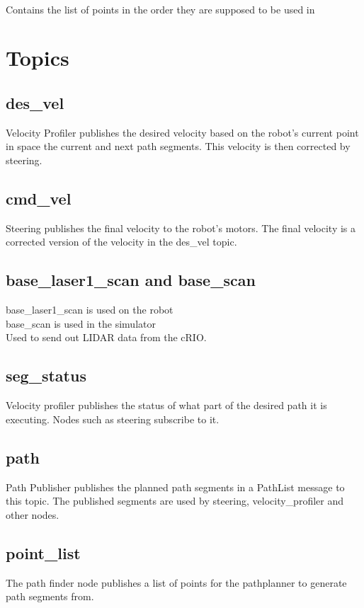\\
\indent Contains the list of points in the order they are supposed to be used in\\

\section{Topics}

\subsection{des\_vel}
Velocity Profiler publishes the desired velocity based on the robot's
current point in space the current and next path segments.  This
velocity is then corrected by steering.

\subsection{cmd\_vel}
Steering publishes the final velocity to the robot's motors.  The
final velocity is a corrected version of the velocity in the des\_vel topic.

\subsection{base\_laser1\_scan and base\_scan}
base\_laser1\_scan is used on the robot\\
base\_scan is used in the simulator\\

\noindent Used to send out LIDAR data from the cRIO.

\subsection{seg\_status}
Velocity profiler publishes the status of what part of the desired path it is executing.  Nodes such as steering subscribe to it.

\subsection{path}
Path Publisher publishes the planned path segments in a PathList message to this topic.  The
published segments are used by steering, velocity\_profiler and other nodes.

\subsection{point\_list}
The path finder node publishes a list of points for the pathplanner to generate path segments from.


